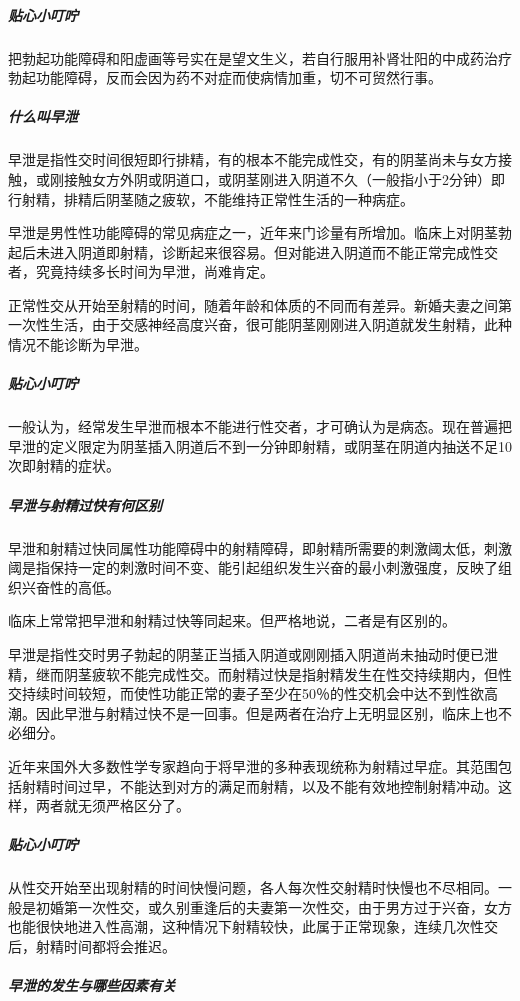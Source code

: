 \subparagraph{贴心小叮咛}

把勃起功能障碍和阳虚画等号实在是望文生义，若自行服用补肾壮阳的中成药治疗勃起功能障碍，反而会因为药不对症而使病情加重，切不可贸然行事。

\subparagraph{什么叫早泄}

早泄是指性交时间很短即行排精，有的根本不能完成性交，有的阴茎尚未与女方接触，或刚接触女方外阴或阴道口，或阴茎刚进入阴道不久（一般指小于2分钟）即行射精，排精后阴茎随之疲软，不能维持正常性生活的一种病症。

早泄是男性性功能障碍的常见病症之一，近年来门诊量有所增加。临床上对阴茎勃起后未进入阴道即射精，诊断起来很容易。但对能进入阴道而不能正常完成性交者，究竟持续多长时间为早泄，尚难肯定。

正常性交从开始至射精的时间，随着年龄和体质的不同而有差异。新婚夫妻之间第一次性生活，由于交感神经高度兴奋，很可能阴茎刚刚进入阴道就发生射精，此种情况不能诊断为早泄。

\subparagraph{贴心小叮咛}

一般认为，经常发生早泄而根本不能进行性交者，才可确认为是病态。现在普遍把早泄的定义限定为阴茎插入阴道后不到一分钟即射精，或阴茎在阴道内抽送不足10次即射精的症状。

\subparagraph{早泄与射精过快有何区别}

早泄和射精过快同属性功能障碍中的射精障碍，即射精所需要的刺激阈太低，刺激阈是指保持一定的刺激时间不变、能引起组织发生兴奋的最小刺激强度，反映了组织兴奋性的高低。

临床上常常把早泄和射精过快等同起来。但严格地说，二者是有区别的。

早泄是指性交时男子勃起的阴茎正当插入阴道或刚刚插入阴道尚未抽动时便已泄精，继而阴茎疲软不能完成性交。而射精过快是指射精发生在性交持续期内，但性交持续时间较短，而使性功能正常的妻子至少在50％的性交机会中达不到性欲高潮。因此早泄与射精过快不是一回事。但是两者在治疗上无明显区别，临床上也不必细分。

近年来国外大多数性学专家趋向于将早泄的多种表现统称为射精过早症。其范围包括射精时间过早，不能达到对方的满足而射精，以及不能有效地控制射精冲动。这样，两者就无须严格区分了。

\subparagraph{贴心小叮咛}

从性交开始至出现射精的时间快慢问题，各人每次性交射精时快慢也不尽相同。一般是初婚第一次性交，或久别重逢后的夫妻第一次性交，由于男方过于兴奋，女方也能很快地进入性高潮，这种情况下射精较快，此属于正常现象，连续几次性交后，射精时间都将会推迟。

\subparagraph{早泄的发生与哪些因素有关}

